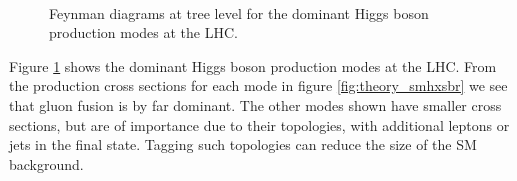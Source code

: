 \begin{figure}[h!]
\begin{center}
~\\
\end{center}
\caption{Feynman diagrams at tree level for the dominant Higgs boson production modes at
the \ac{LHC}.}
\label{fig:theory_smhprod}
\end{figure}

Figure \ref{fig:theory_smhprod} shows the dominant Higgs boson production modes
at the \ac{LHC}. From the production cross sections for each mode in figure
\ref{fig:theory_smhxsbr} we see that gluon fusion is by far dominant. The other modes
shown have smaller cross sections, but are of importance due to their topologies, with
additional leptons or jets in the final state. Tagging such topologies can reduce the size
of the \ac{SM} background.

